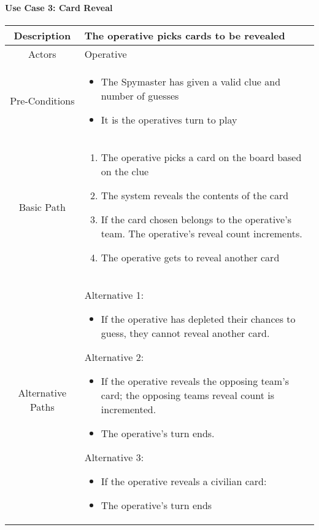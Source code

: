 \documentclass[12pt, a4paper]{article}
\begin{document}
		\paragraph{Use Case 3: Card Reveal}
		\begin{center}
			\begin{tabular}{ |c|p{7cm}| } 
				\hline
				Description & The operative picks cards to be revealed\\ 
				\hline
				Actors & Operative  \\
				\hline 
				Pre-Conditions & \begin{itemize}	
					\item The Spymaster has given a valid clue and number of guesses 
					\item It is the operatives turn to play
				\end{itemize}	
				  \\
				\hline
				Basic Path & 
				\begin{enumerate}
					\item The operative picks a card on the board based on the clue
					\item The system reveals the contents of the card  
					\item If the card chosen belongs to the operative’s team. The operative’s reveal count increments.
					\item The operative gets to reveal another card 
				\end{enumerate} \\
				\hline 
				Alternative Paths & Alternative 1: \begin{itemize}
					\item If the operative has depleted their chances to guess, they cannot reveal another card.
				\end{itemize}
				
				Alternative 2:
				\begin{itemize}
					\item If the operative reveals the opposing team’s card; the opposing teams reveal count is incremented.
					\item The operative’s turn ends.  
				\end{itemize}
			
			Alternative 3:
			\begin{itemize}
				\item If the operative reveals a civilian card: 
				\item The operative’s turn ends   
			\end{itemize}
		

\end{tabular}
\end{center}
\end{document}
